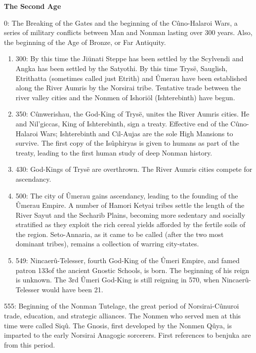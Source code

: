 \documentclass[]{book}
\begin{document}
\textbf{The Second Age}

0: The Breaking of the Gates and the beginning of the Cûno-Halaroi Wars, a
series of military conflicts between Man and Nonman lasting over 300 years.
Also, the beginning of the Age of Bronze, or Far Antiquity.

\begin{enumerate}
\def\labelenumi{\alph{enumi}.}
\setcounter{enumi}{2}
\item
  300: By this time the Jiünati Steppe has been settled by the Scylvendi and Angka has
  been settled by the Satyothi. By this time Trysë, Sauglish, Etrithatta (sometimes
  called just Etrith) and Ûmerau have been established along the River Aumris by
  the Norsirai tribe. Tentative trade between the river valley cities and the
  Nonmen of Ishoriöl (Ishterebinth) have begun.
\item
  350: Cûnwerishau, the God-King of Trysë, unites the River Aumris cities. He and
  Nil'giccas, King of Ishterebinth, sign a treaty. Effective end of the Cûno-Halaroi
  Wars; Ishterebinth and Cil-Aujas are the sole High Mansions to survive. The
  first copy of the Isûphiryas is given to humans as part of the treaty, leading to
  the first human study of deep Nonman history.
\item
  430: God-Kings of Trysë are overthrown. The River Aumris cities compete for
  ascendancy.
\item
  500: The city of Ûmerau gains ascendancy, leading to the founding of the Ûmerau
  Empire. A number of Hamori Ketyai tribes settle the length of the River
  Sayut and the Secharib Plains, becoming more sedentary and socially stratified
  as they exploit the rich cereal yields afforded by the fertile soils of the
  region. Seto-Annaria, as it came to be called (after the two most dominant
  tribes), remains a collection of warring city-states.
\item
  549: Nincaerû-Telesser, fourth God-King of the Ûmeri Empire, and famed patron
  133of the ancient Gnostic Schools, is born. The beginning of his reign is unknown.
  The 3rd Ûmeri God-King is still reigning in 570, when Nincaerû-Telesser would
  have been 21.
\end{enumerate}

555: Beginning of the Nonman Tutelage, the great period of Norsirai-Cûnuroi trade,
education, and strategic alliances. The Nonmen who served men at this time
were called Siqû. The Gnosis, first developed by the Nonmen Qûya, is imparted
to the early Norsirai Anagogic sorcerers. First references to benjuka are from
this period.
\end{document}
